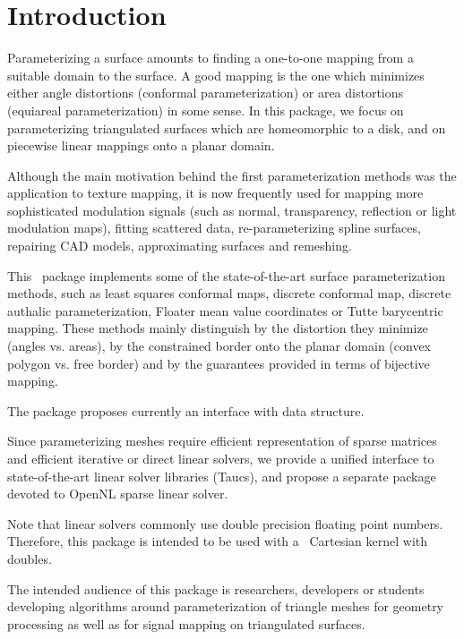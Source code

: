 \section{Introduction}

Parameterizing a surface amounts to finding a one-to-one mapping from
a suitable domain to the surface. A good mapping is the one which
minimizes either angle distortions (conformal parameterization) or
area distortions (equiareal parameterization) in some sense.  In this
package, we focus on parameterizing triangulated surfaces which are
homeomorphic to a disk, and on piecewise linear mappings onto a planar
domain.

Although the main motivation behind the first parameterization methods
was the application to texture mapping, it is now frequently used for
mapping more sophisticated modulation signals (such as normal,
transparency, reflection or light modulation maps), fitting scattered
data, re-parameterizing spline surfaces, repairing CAD models,
approximating surfaces and remeshing.

This \cgal\ package implements some of the state-of-the-art
surface parameterization methods, such as least squares conformal maps,
discrete conformal map, discrete authalic
parameterization, Floater mean value coordinates or Tutte barycentric
mapping. These methods mainly distinguish by the distortion they
minimize (angles vs. areas), by the constrained border onto the
planar domain (convex polygon vs. free border) and by the guarantees
provided in terms of bijective mapping.

The package proposes currently an interface with 
data structure.

Since parameterizing meshes require efficient representation of sparse
matrices and efficient iterative or direct linear solvers, we provide
a unified interface to state-of-the-art linear solver libraries ({\sc Taucs}),
and propose a separate package devoted to OpenNL sparse
linear solver.

Note that linear solvers commonly use double precision floating point
numbers. Therefore, this package is intended to be used with a \cgal\
Cartesian kernel with doubles.

The intended audience of this package is researchers, developers or
students developing algorithms around parameterization of triangle
meshes for geometry processing as well as for signal mapping on
triangulated surfaces.

